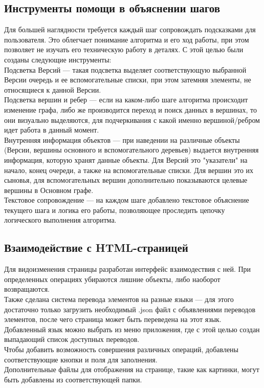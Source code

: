 \documentclass[a4paper,12pt]{extarticle}
\begin{document}
\subsection{Инструменты помощи в объяснении шагов}
Для большей наглядности требуется каждый шаг сопровождать подсказками для пользователя. Это облегчает понимание алгоритма и его ход работы, при этом позволяет не изучать его техническую работу в деталях. С этой целью были созданы следующие инструменты:\\
Подсветка Версий — такая подсветка выделяет соответствующую выбранной Версии очередь и ее вспомогательные списки, при этом затемняя элементы, не относящиеся к данной Версии.\\
Подсветка вершин и ребер — если на каком-либо шаге алгоритма происходит изменение графа, либо же производится переход и поиск данных в вершинах, то они визуально выделяются, для подчеркивания с какой именно вершиной/ребром идет работа в данный момент.\\
Внутренняя информация объектов — при наведении на различные объекты (Версии, вершины основного и вспомогательного деревьев) выдается внутренняя информация, которую хранят данные объекты. Для Версий это "указатели" на начало, конец очереди, а также на вспомогательные списки. Для вершин это их сыновья, для вспомогательных вершин дополнительно показываются целевые вершины в Основном графе.\\
Текстовое сопровождение — на каждом шаге добавлено текстовое объяснение текущего шага и логика его работы, позволяющее проследить цепочку логического выполнения алгоритма.

\subsection{Взаимодействие с HTML-страницей}
Для видоизменения страницы разработан интерфейс взаимодествия с ней. При определенных операциях убираются лишние объекты, либо наоборот возвращаются.\\
Также сделана система перевода элементов на разные языки — для этого достаточно только загрузить необходимый .json файл с объявлениями переводов элементов, после чего страница может быть переведена на этот язык. Добавленный язык можно выбрать из меню приложения, где с этой целью создан выпадающий список доступных переводов.\\
Чтобы добавить возможность совершения различных операций, добавлены соответствующие кнопки и поля для заполнения.\\
Дополнительные файлы для отображения на странице, такие как картинки, могут быть добавлены из соответствующей папки.
\end{document}
